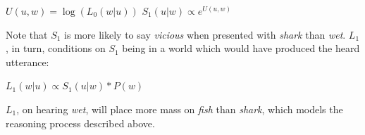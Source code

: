 \documentclass[10pt,letterpaper,twocolumn]{article}
\begin{document}
\begin{exe}
\ex $U(u,w) = \log(L_0(w\vert u))$ \label{utilityfunc}
\ex $S_1(u\vert w) \propto e^{U(u,w)}$ \label{s1simplersa}
\end{exe}

Note that $S_1$ is more likely to say \emph{vicious} when presented with \emph{shark} than \emph{wet}. $L_1$, in turn, conditions on $S_1$ being in a world which would have produced the heard utterance:
\begin{exe}
\ex $L_1(w\vert u) \propto S_1(u\vert w)*P(w)$
\end{exe}

$L_1$, on hearing \emph{wet}, will place more mass on \emph{fish} than \emph{shark}, which models the reasoning process described above.







\end{document}
